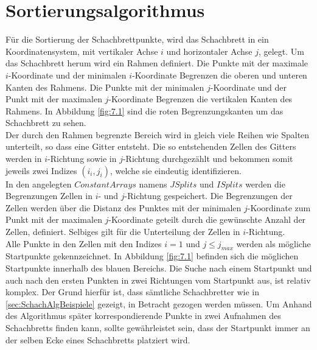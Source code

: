 \section{Sortierungsalgorithmus}

Für die Sortierung der Schachbrettpunkte, wird das Schachbrett in ein Koordinatensystem, mit vertikaler Achse $i$ und horizontaler Achse $j$, gelegt. Um das Schachbrett herum wird ein Rahmen definiert. Die Punkte mit der maximale $i$-Koordinate und der minimalen $i$-Koordinate Begrenzen die oberen und unteren Kanten des Rahmens. Die Punkte mit der minimalen $j$-Koordinate und der Punkt mit der  maximalen $j$-Koordinate Begrenzen die vertikalen Kanten des Rahmens. In Abbildung \ref{fig:7.1} sind die roten Begrenzungskanten um das Schachbrett zu sehen.\\

Der durch den Rahmen begrenzte Bereich wird in gleich viele Reihen wie Spalten unterteilt, so dass eine Gitter entsteht. Die so entstehenden Zellen des Gitters werden in $i$-Richtung sowie in $j$-Richtung durchgezählt und bekommen somit jeweils zwei Indizes $(i_i,j_i)$, welche sie eindeutig identifizieren.\\

In den angelegten $ConstantArrays$ namens $JSplits$ und $ISplits$ werden die Begrenzungen Zellen in $i$- und $j$-Richtung gespeichert. Die Begrenzungen der Zellen werden über die Distanz des Punktes mit der minimalen $j$-Koordinate zum Punkt mit der maximalen $j$-Koordinate geteilt durch die gewünschte Anzahl der Zellen, definiert. Selbiges gilt für die Unterteilung der Zellen in $i$-Richtung. \\ 

Alle Punkte in den Zellen mit den Indizes $i=1$ und $j \leq  j_{max}$ werden als mögliche Startpunkte gekennzeichnet. In Abbildung \ref{fig:7.1} befinden sich die möglichen Startpunkte innerhalb des blauen Bereichs. Die Suche nach einem Startpunkt und auch nach den ersten Punkten in zwei Richtungen vom Startpunkt aus, ist relativ komplex. Der Grund hierfür ist, dass sämtliche Schachbretter wie in \ref{sec:SchachAlgBeispiele} gezeigt, in Betracht gezogen werden müssen. Um Anhand des Algorithmus später korrespondierende Punkte in zwei Aufnahmen des Schachbretts finden kann, sollte gewährleistet sein, dass der Startpunkt immer an der selben Ecke eines Schachbretts platziert wird.\\

